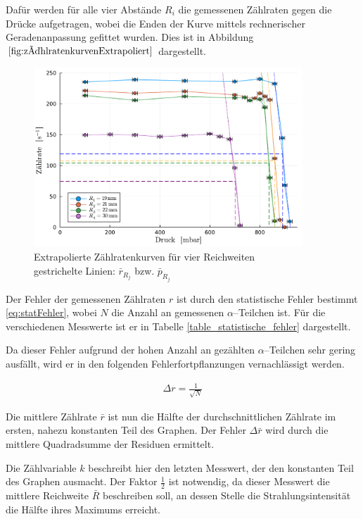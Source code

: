 \documentclass[12pt,a4paper]{scrartcl}
\numberwithin{equation}{section} %
\begin{document}
Dafür werden für alle vier Abstände $R_i$ die gemessenen Zählraten gegen die Drücke aufgetragen, wobei die Enden der Kurve mittels rechnerischer Geradenanpassung gefittet wurden. Dies ist in Abbildung $\ref{fig:zählratenkurvenExtrapoliert}$ dargestellt.

\begin{figure}[h!]
	\centering
	\includegraphics[width=0.9\textwidth]{../media/B3.3/zaehlratenkurven extrapoliert.pdf}
	\caption{Extrapolierte Zählratenkurven für vier Reichweiten\\
			gestrichelte Linien: $\bar r_{R_j}$ bzw. $\bar p_{R_j}$}
	\label{fig:zählratenkurvenExtrapoliert}
\end{figure}


Der Fehler der gemessenen Zählraten $r$ ist durch den statistische Fehler bestimmt \eqref{eq:statFehler}, wobei $N$ die Anzahl an gemessenen $\alpha$--Teilchen ist. Für die verschiedenen Messwerte ist er in Tabelle \ref{table_statistische_fehler} dargestellt.

Da dieser Fehler aufgrund der hohen Anzahl an gezählten $\alpha$--Teilchen sehr gering ausfällt, wird er in den folgenden Fehlerfortpflanzungen vernachlässigt werden.

\begin{eqnarray}
	\Delta r = \frac{1}{\sqrt{N}}
	\label{eq:statFehler}
\end{eqnarray}

\noindent
Die mittlere Zählrate $\bar{r}$ ist nun die Hälfte der durchschnittlichen Zählrate im ersten, nahezu konstanten Teil des Graphen. Der Fehler $\Delta \bar{r}$ wird durch die mittlere Quadradsumme der Residuen ermittelt.

Die Zählvariable $k$ beschreibt hier den letzten Messwert, der den konstanten Teil des Graphen ausmacht. Der Faktor $\frac{1}{2}$ ist notwendig, da dieser Messwert die mittlere Reichweite $\bar R$ beschreiben soll, an dessen Stelle die Strahlungsintensität die Hälfte ihres Maximums erreicht.
\end{document}
